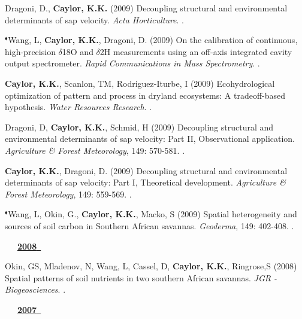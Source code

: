 \begin{etaremune}
\item Dragoni, D., \textbf{ Caylor, K.K.} (2009) Decoupling structural and environmental determinants of sap velocity. \emph{Acta Horticulture}. .
\item $^{\blacklozenge}$Wang, L, \textbf{ Caylor, K.K.}, Dragoni, D. (2009) On the calibration of continuous, high-precision $\delta$18O and $\delta$2H measurements using an off-axis integrated cavity output spectrometer. \emph{Rapid Communications in Mass Spectrometry}. .
\item \textbf{ Caylor, K.K.}, Scanlon, TM, Rodriguez-Iturbe, I (2009) Ecohydrological optimization of pattern and process in dryland ecosystems: A tradeoff-based hypothesis. \emph{Water Resources Research}. .
\item Dragoni, D, \textbf{ Caylor, K.K.}, Schmid, H (2009) Decoupling structural and environmental determinants of sap velocity: Part II, Observational application. \emph{Agriculture \& Forest Meteorology}, 149: 570-581. .
\item \textbf{ Caylor, K.K.}, Dragoni, D. (2009) Decoupling structural and environmental determinants of sap velocity: Part I, Theoretical development. \emph{Agriculture \& Forest Meteorology}, 149: 559-569. .
\item $^{\blacklozenge}$Wang, L, Okin, G., \textbf{ Caylor, K.K.}, Macko, S (2009) Spatial heterogeneity and sources of soil carbon in Southern African savannas. \emph{Geoderma}, 149: 402-408. .

\vspace{0.1in}
\mbox{\ \ \ \underline{\textbf{2008 }}}
\vspace{0.1in}

\item Okin, GS, Mladenov, N, Wang, L, Cassel, D, \textbf{ Caylor, K.K.}, Ringrose,S (2008) Spatial patterns of soil nutrients in two southern African savannas. \emph{JGR - Biogeosciences}. .

\vspace{0.1in}
\mbox{\ \ \ \underline{\textbf{2007 }}}
\vspace{0.1in}


\end{etaremune}
